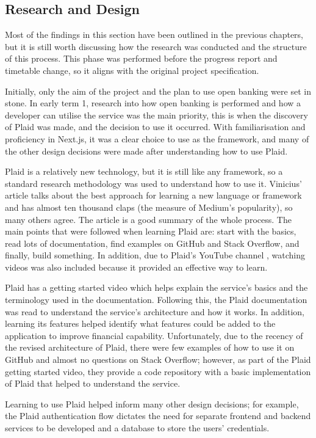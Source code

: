 \subsection{Research and Design}
Most of the findings in this section have been outlined in the previous chapters, but it is still worth discussing how the research was conducted and the structure of this process. This phase was performed before the progress report and timetable change, so it aligns with the original project specification.

Initially, only the aim of the project and the plan to use open banking were set in stone. In early term 1, research into how open banking is performed and how a developer can utilise the service was the main priority, this is when the discovery of Plaid was made, and the decision to use it occurred. With familiarisation and proficiency in Next.js, it was a clear choice to use as the framework, and many of the other design decisions were made after understanding how to use Plaid.

Plaid is a relatively new technology, but it is still like any framework, so a standard research methodology was used to understand how to use it. Vinicius' article \cite{FrameworkLearning} talks about the best approach for learning a new language or framework and has almost ten thousand claps (the measure of Medium's popularity), so many others agree. The article is a good summary of the whole process. The main points that were followed when learning Plaid are: start with the basics, read lots of documentation, find examples on GitHub and Stack Overflow, and finally, build something. In addition, due to Plaid's YouTube channel \cite{PlaidYouTube}, watching videos was also included because it provided an effective way to learn.

Plaid has a getting started video which helps explain the service's basics and the terminology used in the documentation. Following this, the Plaid documentation was read to understand the service's architecture and how it works. In addition, learning its features helped identify what features could be added to the application to improve financial capability. Unfortunately, due to the recency of the revised architecture of Plaid, there were few examples of how to use it on GitHub and almost no questions on Stack Overflow; however, as part of the Plaid getting started video, they provide a code repository with a basic implementation of Plaid that helped to understand the service.

Learning to use Plaid helped inform many other design decisions; for example, the Plaid authentication flow dictates the need for separate frontend and backend services to be developed and a database to store the users' credentials.

